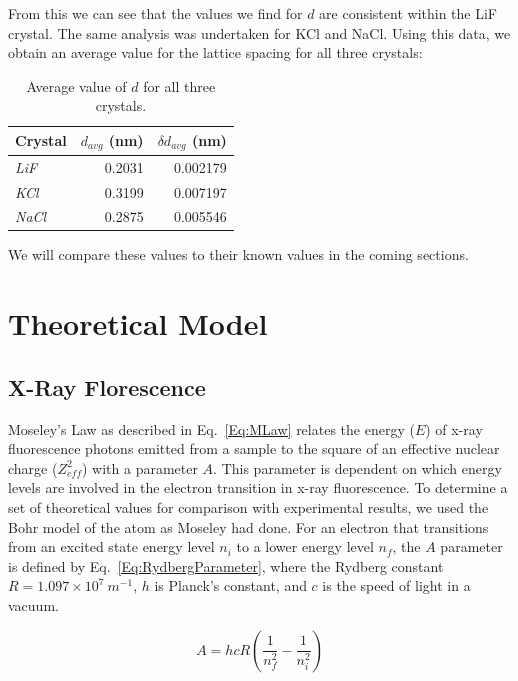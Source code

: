 \documentclass[%
 reprint,
 amsmath,amssymb,
 aps,
 pra,
]{revtex4-1}
\begin{document}
\noindent From this we can see that the values we find for $d$ are consistent within the LiF crystal. The same analysis was undertaken for KCl and NaCl. Using this data, we obtain an average value for the lattice spacing for all three crystals:

\begin{table}[htbp]
	\begin{center}
	\begin{tabular}{|l|r|r|}
		\hline
		Crystal & \multicolumn{1}{l|}{$d_{avg}$ (nm)} & \multicolumn{1}{l|}{$\delta d_{avg}$ (nm)} \\ \hline
		\textit{LiF} & 0.2031 & 0.002179 \\ \hline
		\textit{KCl} & 0.3199 & 0.007197 \\ \hline
		\textit{NaCl} & 0.2875 & 0.005546 \\ \hline
	\end{tabular}
	\end{center}
	\caption{Average value of $d$ for all three crystals.}
	\label{table:d_average}
\end{table}

\noindent We will compare these values to their known values in the coming sections.

\section{Theoretical Model}

\subsection{X-Ray Florescence}

Moseley's Law as described in Eq.~\ref{Eq:MLaw} relates the energy ($E$) of x-ray fluorescence photons emitted from a sample to the square of an effective nuclear charge ($Z_{eff}^{2}$) with a parameter $A$. This parameter is dependent on which energy levels are involved in the electron transition in x-ray fluorescence. To determine a set of theoretical values for comparison with experimental results, we used the Bohr model of the atom as Moseley had done. For an electron that transitions from an excited state energy level $n_{i}$ to a lower energy level $n_{f}$, the $A$ parameter is defined by Eq.~\ref{Eq:RydbergParameter}, where the Rydberg constant $R = 1.097 \times 10^7~m^{-1}$, $h$ is Planck's constant, and $c$ is the speed of light in a vacuum.

\begin{equation}\label{Eq:RydbergParameter}
A = hcR \left( \frac{1}{n_{f}^{2}} - \frac{1}{n_{i}^{2}} \right)
\end{equation}
\end{document}
